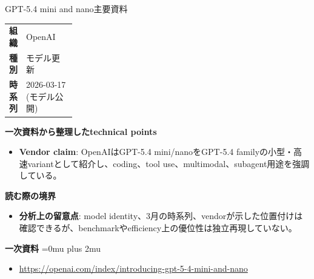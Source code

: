 \begin{technicalnote}{GPT-5.4 mini and nano}{主要資料}
\begingroup
\begin{tabularx}{\linewidth}{@{}>{\bfseries}p{0.22\linewidth}X@{}}
組織 & OpenAI \\
種別 & モデル更新 \\
時系列 & 2026-03-17 (モデル公開) \\
\end{tabularx}
\smallskip
{\bfseries 一次資料から整理したtechnical points}
\begin{itemize}[leftmargin=1.5em,itemsep=0.35em]
\item \textbf{Vendor claim}: OpenAIはGPT-5.4 mini/nanoをGPT-5.4 familyの小型・高速variantとして紹介し、coding、tool use、multimodal、subagent用途を強調している。
\end{itemize}
\begin{minipage}{\linewidth}
{\bfseries 読む際の境界}
\begin{itemize}[leftmargin=1.5em,itemsep=0.35em]
\item \textbf{分析上の留意点}: model identity、3月の時系列、vendorが示した位置付けは確認できるが、benchmarkやefficiency上の優位性は独立再現していない。
\end{itemize}
\begin{samepage}
{\bfseries 一次資料}
\begingroup\sloppy
\Urlmuskip=0mu plus 2mu\relax
\begin{itemize}[leftmargin=1.5em,itemsep=0.25em]
\item {\scriptsize\url{https://openai.com/index/introducing-gpt-5-4-mini-and-nano}}
\end{itemize}
\endgroup
\end{samepage}
\end{minipage}
\endgroup
\end{technicalnote}
\medskip

